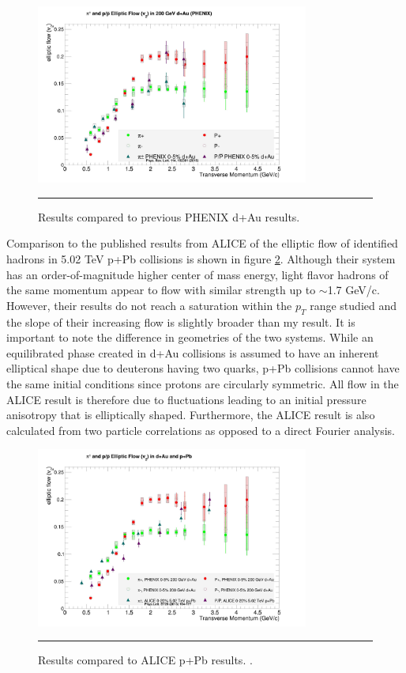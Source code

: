 \begin{figure}[hbtp]
\centering    
    \includegraphics[width=0.8\textwidth]{results/v2allvsshengli.jpg}
    \rule{35em}{0.5pt}
    \caption[Results compared to previous PHENIX d+Au results.]{Results compared to previous PHENIX d+Au results. \citep{Adare:2014keg}}
    \label{fig:v2allvsshengli}
\end{figure}
Comparison to the published results from ALICE of the elliptic flow of identified hadrons in 5.02 TeV p+Pb collisions is shown in figure \ref{fig:v2allvsalice}. Although their system has an order-of-magnitude higher center of mass energy, light flavor hadrons of the same momentum appear to flow with similar strength up to $\sim$1.7 GeV/c. However, their results do not reach a saturation within the $p_T$ range studied and the slope of their increasing flow is slightly broader than my result. It is important to note the difference in geometries of the two systems. While an equilibrated phase created in d+Au collisions is assumed to have an inherent elliptical shape due to deuterons having two quarks, p+Pb collisions cannot have the same initial conditions since protons are circularly symmetric. All flow in the ALICE result is therefore due to fluctuations leading to an initial pressure anisotropy that is elliptically shaped. Furthermore, the ALICE result is also calculated from two particle correlations as opposed to a direct Fourier analysis. 

\begin{figure}[hbtp]
\centering    
    \includegraphics[width=0.8\textwidth]{results/v2allvsalice.jpg}
    \rule{35em}{0.5pt}
    \caption[Results compared to ALICE p+Pb results.]{Results compared to ALICE p+Pb results. \citep{ABELEV:2013wsa}.}
    \label{fig:v2allvsalice}
\end{figure}

